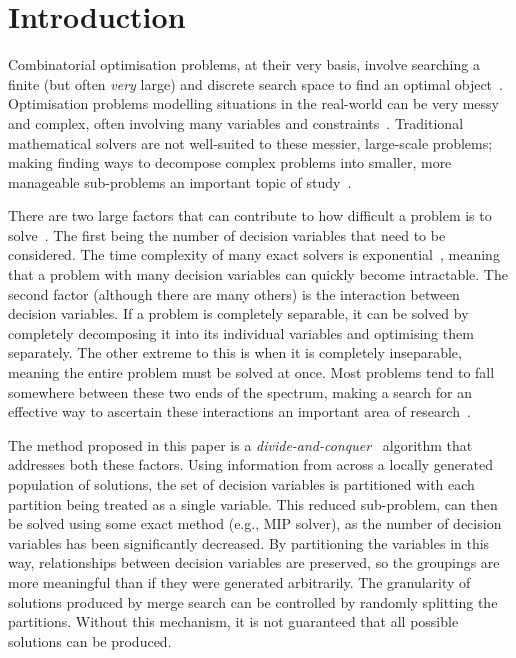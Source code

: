 \documentclass[preprint]{elsarticle}
\begin{document}

\section{Introduction}\label{sec:intro}

Combinatorial optimisation problems, at their very basis, involve searching a finite (but often \emph{very} large) and discrete search space to find an optimal object~\citep{copalg}. 
Optimisation problems modelling situations in the real-world can be very messy and complex, often involving many variables and constraints~\citep{deb_book}. Traditional mathematical solvers are not well-suited to these messier, large-scale problems; making finding ways to decompose complex problems into smaller, more manageable sub-problems an important topic of study~\citep{hybridmeta}.

There are two large factors that can contribute to how difficult a problem is to solve~\citep{int_and_cop}. The first being the number of decision variables that need to be considered. The time complexity of many exact solvers is exponential~\citep{convex}, meaning that a problem with many decision variables can quickly become intractable. 
The second factor (although there are many others) is the interaction between decision variables. If a problem is completely separable, it can be solved by completely decomposing it into its individual variables and optimising them separately. The other extreme to this is when it is completely inseparable, meaning the entire problem must be solved at once. Most problems tend to fall somewhere between these two ends of the spectrum, making a search for an effective way to ascertain these interactions an important area of research~\citep{decomp,omidvar}.

The method proposed in this paper is a \emph{divide-and-conquer}~\citep{alg:levitin} algorithm that addresses both these factors. Using information from across a locally generated population of solutions, the set of decision variables is partitioned with each partition being treated as a single variable. This reduced sub-problem, can then be solved using some exact method (e.g., MIP solver), as the number of decision variables has been significantly decreased. By partitioning the variables in this way, relationships between decision variables are preserved, so the groupings are more meaningful than if they were generated arbitrarily. The granularity of solutions produced by merge search can be controlled by randomly splitting the partitions. Without this mechanism, it is not guaranteed that all possible solutions can be produced.
\end{document}
